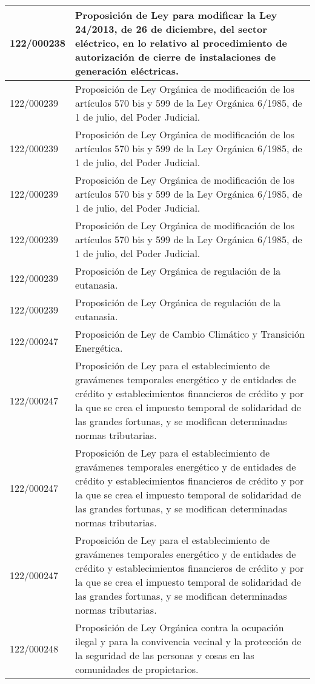 {\begin{table}[H]
\begin{center}
\begin{tabularx}{\linewidth}{| l | X |}
\hline
122/000238 & Proposición de Ley para modificar la Ley 24/2013, de 26 de diciembre, del sector eléctrico, en lo relativo al procedimiento de autorización de cierre de instalaciones de generación eléctricas. \\
\hline
122/000239 & Proposición de Ley Orgánica de modificación de los artículos 570 bis y 599 de la Ley Orgánica 6/1985, de 1 de julio, del Poder Judicial. \\
\hline
122/000239 & Proposición de Ley Orgánica de modificación de los artículos 570 bis y 599 de la Ley Orgánica 6/1985, de 1 de julio, del Poder Judicial. \\
\hline
122/000239 & Proposición de Ley Orgánica de modificación de los artículos 570 bis y 599 de la Ley Orgánica 6/1985, de 1 de julio, del Poder Judicial. \\
\hline
122/000239 & Proposición de Ley Orgánica de modificación de los artículos 570 bis y 599 de la Ley Orgánica 6/1985, de 1 de julio, del Poder Judicial. \\
\hline
122/000239 & Proposición de Ley Orgánica de regulación de la eutanasia. \\
\hline
122/000239 & Proposición de Ley Orgánica de regulación de la eutanasia. \\
\hline
122/000247 & Proposición de Ley de Cambio Climático y Transición Energética. \\
\hline
122/000247 & Proposición de Ley para el establecimiento de gravámenes temporales energético y de entidades de crédito y establecimientos financieros de crédito y por la que se crea el impuesto temporal de solidaridad de las grandes fortunas, y se modifican determinadas normas tributarias. \\
\hline
122/000247 & Proposición de Ley para el establecimiento de gravámenes temporales energético y de entidades de crédito y establecimientos financieros de crédito y por la que se crea el impuesto temporal de solidaridad de las grandes fortunas, y se modifican determinadas normas tributarias. \\
\hline
122/000247 & Proposición de Ley para el establecimiento de gravámenes temporales energético y de entidades de crédito y establecimientos financieros de crédito y por la que se crea el impuesto temporal de solidaridad de las grandes fortunas, y se modifican determinadas normas tributarias. \\
\hline
122/000248 & Proposición de Ley Orgánica contra la ocupación ilegal y para la convivencia vecinal y la protección de la seguridad de las personas y cosas en las comunidades de propietarios. \\

\end{tabularx}
\end{center}
\end{table}}
